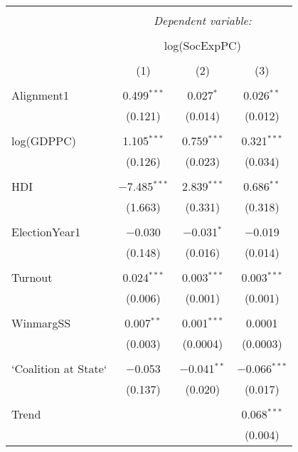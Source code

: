 
\begin{table}[!htbp] \centering 
  \caption{} 
  \label{} 
\begin{tabular}{@{\extracolsep{5pt}}lccc} 
\\[-1.8ex]\hline 
\hline \\[-1.8ex] 
 & \multicolumn{3}{c}{\textit{Dependent variable:}} \\ 
\cline{2-4} 
\\[-1.8ex] & \multicolumn{3}{c}{log(SocExpPC)} \\ 
\\[-1.8ex] & (1) & (2) & (3)\\ 
\hline \\[-1.8ex] 
 Alignment1 & 0.499$^{***}$ & 0.027$^{*}$ & 0.026$^{**}$ \\ 
  & (0.121) & (0.014) & (0.012) \\ 
  & & & \\ 
 log(GDPPC) & 1.105$^{***}$ & 0.759$^{***}$ & 0.321$^{***}$ \\ 
  & (0.126) & (0.023) & (0.034) \\ 
  & & & \\ 
 HDI & $-$7.485$^{***}$ & 2.839$^{***}$ & 0.686$^{**}$ \\ 
  & (1.663) & (0.331) & (0.318) \\ 
  & & & \\ 
 ElectionYear1 & $-$0.030 & $-$0.031$^{*}$ & $-$0.019 \\ 
  & (0.148) & (0.016) & (0.014) \\ 
  & & & \\ 
 Turnout & 0.024$^{***}$ & 0.003$^{***}$ & 0.003$^{***}$ \\ 
  & (0.006) & (0.001) & (0.001) \\ 
  & & & \\ 
 WinmargSS & 0.007$^{**}$ & 0.001$^{***}$ & 0.0001 \\ 
  & (0.003) & (0.0004) & (0.0003) \\ 
  & & & \\ 
 `Coalition at State` & $-$0.053 & $-$0.041$^{**}$ & $-$0.066$^{***}$ \\ 
  & (0.137) & (0.020) & (0.017) \\ 
  & & & \\ 
 Trend &  &  & 0.068$^{***}$ \\ 
  &  &  & (0.004) \\ 

\end{tabular}
\end{table}
